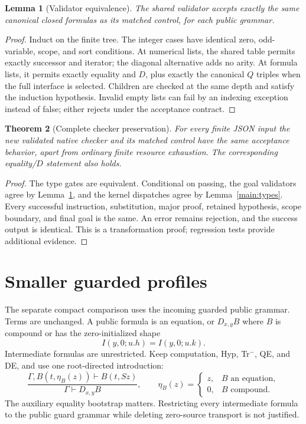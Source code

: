 \documentclass[11pt]{article}
\newtheorem{theorem}{Theorem}[section]
\newtheorem{lemma}[theorem]{Lemma}
\theoremstyle{definition}\newtheorem{definition}[theorem]{Definition}
\theoremstyle{remark}\newtheorem{remark}[theorem]{Remark}
\begin{document}
\begin{lemma}[Validator equivalence]\label{main:validator}
The shared validator accepts exactly the same canonical closed
formulas as its matched control, for each public grammar.
\end{lemma}
\begin{proof}
Induct on the finite tree. The integer cases have identical
zero, odd-variable, scope, and sort conditions. At numerical lists,
the shared table permits exactly successor and iterator; the
diagonal alternative adds no arity. At formula lists, it permits
exactly equality and $D$, plus exactly the canonical $Q$ triples
when the full interface is selected. Children are checked at the
same depth and satisfy the induction hypothesis. Invalid empty
lists can fail by an indexing exception instead of false; either
rejects under the acceptance contract.
\end{proof}



\begin{theorem}[Complete checker preservation]
For every finite JSON input the new validated native checker and
its matched control have the same acceptance behavior, apart from
ordinary finite resource exhaustion. The corresponding equality/$D$
statement also holds.
\end{theorem}
\begin{proof}
The type gates are equivalent. Conditional on passing, the goal
validators agree by Lemma~\ref{main:validator}, and the kernel
dispatches agree by Lemma~\ref{main:types}. Every successful
instruction, substitution, major proof, retained hypothesis,
scope boundary, and final goal is the same. An error remains
rejection, and the success output is identical. This is a
transformation proof; regression tests provide additional evidence.
\end{proof}

\section{Smaller guarded profiles}

The separate compact comparison uses the incoming guarded public
grammar. Terms are unchanged. A public formula is an equation, or
$D_{x,y}B$ where $B$ is compound or has the zero-initialized shape
\[
                     I(y,0;u.h)=I(y,0;u.k).
\tag{Guard}
\]
Intermediate formulas are unrestricted. Keep computation, Hyp,
Tr$^{-}$, QE, and DE, and use one root-directed introduction:
\[
\frac{\Gamma,B(t,\eta_B(z))\vdash B(t,Sz)}
     {\Gamma\vdash D_{x,y}B},\qquad
\eta_B(z)=
\begin{cases}z,&B\text{ an equation},\\0,&B\text{ compound}.\end{cases}
\tag{Root DI}
\]
The auxiliary equality bootstrap matters. Restricting every
intermediate formula to the public guard grammar while deleting
zero-source transport is not justified.
\end{document}

